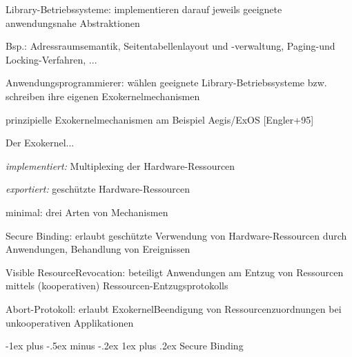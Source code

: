 \documentclass[a4paper]{article}
\makeatletter
\renewcommand{\subsubsection}{\@startsection{subsubsection}{3}{0mm}%
 {-1ex plus -.5ex minus -.2ex}%
 {1ex plus .2ex}%
 {\normalfont\small\bfseries}}
\makeatother
\begin{document}
\begin{multicols}{3}
\begin{itemize*}
\begin{itemize*}
            \item Library-Betriebssysteme: implementieren darauf jeweils geeignete anwendungsnahe Abstraktionen \begin{itemize*} \item Bsp.: Adressraumsemantik, Seitentabellenlayout und -verwaltung, Paging-und Locking-Verfahren, ... \end{itemize*}
            \item Anwendungsprogrammierer: wählen geeignete Library-Betriebssysteme bzw. schreiben ihre eigenen Exokernelmechanismen
        \end{itemize*}
        \item
        prinzipielle Exokernelmechanismen am Beispiel Aegis/ExOS
        {[}Engler+95{]}
        \begin{itemize*}
            \item Der Exokernel... \begin{itemize*} \item \emph{implementiert:} Multiplexing der Hardware-Ressourcen \item \emph{exportiert:} geschützte Hardware-Ressourcen \end{itemize*}
        \end{itemize*}
        \item
        minimal: drei Arten von Mechanismen
        \begin{enumerate*}

            \item Secure Binding: erlaubt geschützte Verwendung von Hardware-Ressourcen durch Anwendungen, Behandlung von Ereignissen
            \item Visible ResourceRevocation: beteiligt Anwendungen am Entzug von Ressourcen mittels (kooperativen) Ressourcen-Entzugsprotokolls
            \item Abort-Protokoll: erlaubt ExokernelBeendigung von Ressourcenzuordnungen bei unkooperativen Applikationen
        \end{enumerate*}
    \end{itemize*}


    \subsubsection{Secure Binding}


\end{multicols}
\end{document}
